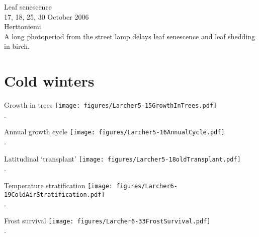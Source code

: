 \documentclass[10pt]{beamer}
\begin{document}
\begin{frame}{Leaf senescence}
    \\
    {\small 17, 18, 25, 30 October 2006\\Herttoniemi.\\
    A long photoperiod from the street lamp delays leaf senescence and
    leaf shedding in birch.}
\end{frame}

\section{Cold winters}

\begin{frame}{Growth in trees}
    \centering
    \texttt{[image: figures/Larcher5-15GrowthInTrees.pdf]}\\
    {\small \autocite[from][]{Larcher2003}.}
\end{frame}

\begin{frame}{Annual growth cycle}
    \centering
    \texttt{[image: figures/Larcher5-16AnnualCycle.pdf]}\\
    {\small \autocite[from][]{Larcher2003}.}
\end{frame}

\begin{frame}{Latitudinal `transplant'}
    \centering
    \texttt{[image: figures/Larcher5-18oldTransplant.pdf]}\\
    {\small \autocite[from][]{Larcher1995}.}
\end{frame}

\begin{frame}{Temperature stratification}
    \centering
    \texttt{[image: figures/Larcher6-19ColdAirStratification.pdf]}\\
    {\small \autocite[from][]{Larcher2003}.}
\end{frame}

\begin{frame}{Frost survival}
    \centering
    \texttt{[image: figures/Larcher6-33FrostSurvival.pdf]}\\
    {\small \autocite[from][]{Larcher2003}.}
\end{frame}
\end{document}
